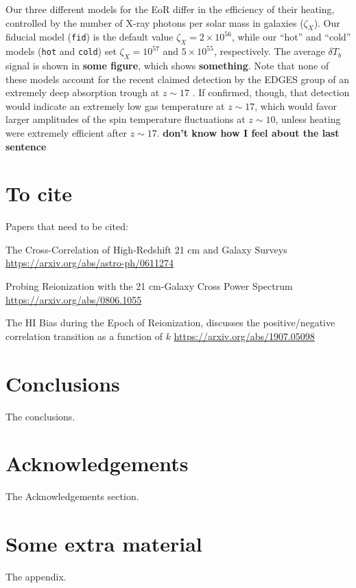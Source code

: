 \documentclass[a4paper,fleqn,usenatbib]{mnras}
\newcommand{\fid}{\texttt{fid}}
\newcommand{\hot}{\texttt{hot}}
\newcommand{\cold}{\texttt{cold}}
\begin{document}
Our three different models for the EoR differ in the efficiency of their
heating, controlled by the number of X-ray photons per solar mass in galaxies
($\zeta_X$). Our fiducial model (\fid{}) is the default value
$\zeta_X=2\times10^{56}$, while our ``hot'' and ``cold'' models (\hot{} and
\cold{}) set $\zeta_X=10^{57}$ and $5\times10^{55}$, respectively. The average
$\delta T_b$ signal is shown in \textbf{some figure}, which shows
\textbf{something}. Note that none of these models account for the recent
claimed detection by the EDGES group of an extremely deep absorption trough at
$z\sim17$ \citep{2018Natur.555...67B}. If confirmed, though, that detection
would indicate an extremely low gas temperature at $z\sim17$, which would
favor larger amplitudes of the spin temperature fluctuations at $z\sim10$,
unless heating were extremely efficient after $z\sim17$. {\bf don't know how I
feel about the last sentence}




\section{To cite}
Papers that need to be cited:

The Cross-Correlation of High-Redshift 21 cm and Galaxy Surveys
\url{https://arxiv.org/abs/astro-ph/0611274}

Probing Reionization with the 21 cm-Galaxy Cross Power Spectrum
\url{https://arxiv.org/abs/0806.1055}

The HI Bias during the Epoch of Reionization, discusses the positive/negative
correlation transition as a function of $k$
\url{https://arxiv.org/abs/1907.05098}

\section{Conclusions}

The conclusions.

\section*{Acknowledgements}

The Acknowledgements section.






\appendix

\section{Some extra material}

The appendix.



\bsp	%
\label{lastpage}
\end{document}
